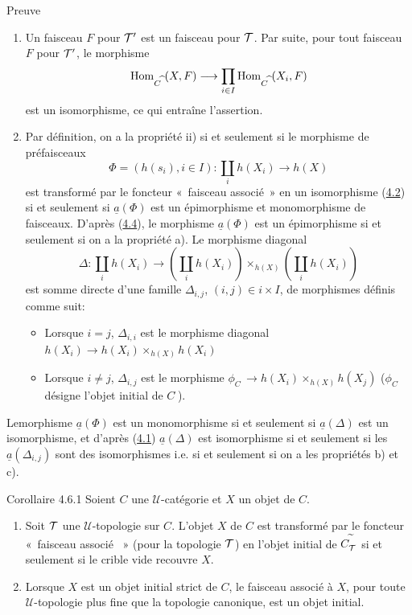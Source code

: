 \documentclass[10pt]{../fichiers-configuration-latex/smfart}
\begin{document}
\begin{enonce*}[remark]{Preuve}
\begin{enumerate}
\renewcommand{\labelenumi}{\theenumi)}
\item Un faisceau $F$ pour ${\mathcal T}'$ est un faisceau pour
  ${\mathcal T}$. Par suite, pour tout faisceau $F$ pour
  ${\mathcal T}'$, le morphisme
$$
\operatorname{Hom}_{C^{\widehat{\phantom{,}}}}(X,F)\longrightarrow \prod_{i\in I}
\operatorname{Hom}_{C^{\widehat{\phantom{,}}}}(X_i,F)
$$
est un isomorphisme, ce qui entraîne l'assertion.

\item Par définition, on a la propriété ii) si et seulement si
  le morphisme de préfaisceaux
$$
\Phi=(h(s_i),i\in I):\coprod_i h(X_i)\longrightarrow h(X)
$$
est transformé par le foncteur « faisceau associé » en un
isomorphisme \ie (\hyperref[II.prop4.2]{4.2}) si et seulement si
$\underline{a}(\Phi)$ est un épimorphisme et monomorphisme de faisceaux.
D'après (\hyperref[II.theo4.4]{4.4}), le morphisme $\underline{a}(\Phi)$ est un
épimorphisme si et seulement si on a la propriété a). Le morphisme
diagonal
$$
\Delta:\coprod_i h(X_i)\longrightarrow (\coprod_i
h(X_i))\times_{h(X)}(\coprod_i h(X_i))
$$
est somme directe d'une famille $\Delta_{i,j}$, $(i,j)\in i\times
I$, de morphismes définis comme suit:
\begin{itemize}
\item[$\beta)$] Lorsque $i=j$, $\Delta_{i,i}$ est le morphisme
  diagonal $h(X_i)\rightarrow h(X_i)\times_{h(X)}h(X_i)$

\item[$\gamma)$] Lorsque $i\neq j$, $\Delta_{i,j}$ est le morphisme
  $\phi_{C^{\widehat{\phantom{,}}}}\rightarrow
  h(X_i)\times_{h(X)}h(X_j)$ ($\phi_{C^{\widehat{\phantom{,}}}}$
  désigne l'objet initial de $C^{\widehat{\phantom{,}}}$).
\end{itemize}
\end{enumerate}
\end{enonce*}

Le\pageoriginale morphisme $\underline{a}(\Phi)$ est un monomorphisme si
et seulement si $\underline{a}(\Delta)$ est un isomorphisme, et d'après
(\hyperref[II.theo4.1]{4.1}) $\underline{a}(\Delta)$ est isomorphisme si et
seulement si les $\underline{a}(\Delta_{i,j})$ sont des isomorphismes
i.e. si et seulement si on a les propriétés b) et c).

\begin{enonce*}{Corollaire 4.6.1}
Soient $C$ une $𝒰$-catégorie et $X$ un objet de $C$.
\begin{enumerate}
\renewcommand{\labelenumi}{\theenumi)}
\item Soit ${\mathcal T}$ une $𝒰$-topologie sur $C$. L'objet
  $X$ de $C$ est transformé par le foncteur « faisceau associé
  » (pour la topologie ${\mathcal T}$) en l'objet initial de
  $C^{\widetilde{\phantom{,}}}_{{\mathcal T}}$ si et seulement si le
  crible vide recouvre $X$.

\item Lorsque $X$ est un objet initial strict de $C$, le faisceau
  associé à $X$, pour toute $𝒰$-topologie plus fine que la
  topologie canonique, est un objet initial.
\end{enumerate}
\end{enonce*}
\end{document}
